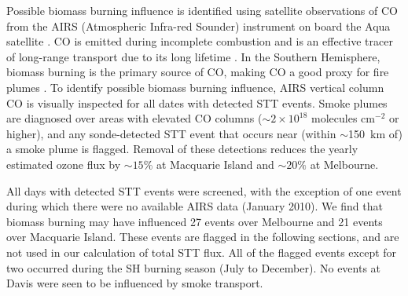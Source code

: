 \documentclass[acp, manuscript]{copernicus} %
\begin{document}
    Possible biomass burning influence is identified using satellite observations of CO from the AIRS (Atmospheric Infra-red Sounder) instrument on board the Aqua satellite \citep{AIRS3STD}.
    CO is emitted during incomplete combustion and is an effective tracer of long-range transport due to its long lifetime \citep{Edwards2003, Edwards2006}.
    In the Southern Hemisphere, biomass burning is the primary source of CO, making CO a good proxy for fire plumes \citep[e.g.][]{Sinha2004, Mari2008}.
    To identify possible biomass burning influence, AIRS vertical column CO is visually inspected for all dates with detected STT events.
    Smoke plumes are diagnosed over areas with elevated CO columns ($\sim 2 \times 10^{18}$ molecules cm$^{-2}$ or higher), and any sonde-detected STT event that occurs near (within $\sim$150~km of) a smoke plume is flagged.
    Removal of these detections reduces the yearly estimated ozone flux by $\sim 15\%$ at Macquarie Island and $\sim 20\%$ at Melbourne.
  
    All days with detected STT events were screened, with the exception of one event during which there were no available AIRS data (January 2010).
    We find that biomass burning may have influenced 27 events over Melbourne and 21 events over Macquarie Island.
    These events are flagged in the following sections, and are not used in our calculation of total STT flux.
    All of the flagged events except for two occurred during the SH burning season (July to December). %
    No events at Davis were seen to be influenced by smoke transport.
\end{document}
